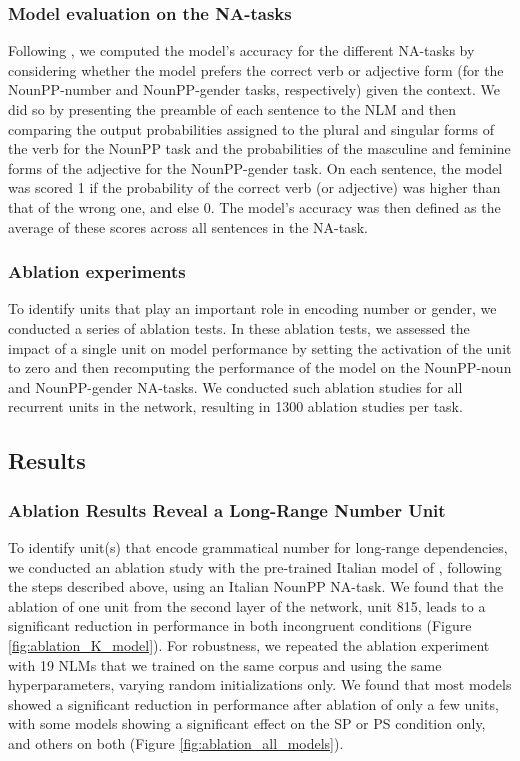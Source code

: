 \subsubsection{Model evaluation on the NA-tasks}\label{sss:model_eval}
Following \citet{Linzen:etal:2016}, we computed the model's accuracy for the different NA-tasks by considering whether the model prefers the correct verb or adjective form (for the NounPP-number and NounPP-gender tasks, respectively) given the context. We did so by presenting the preamble of each sentence to the NLM and then comparing the output probabilities assigned to the plural and singular forms of the verb for the NounPP task and the probabilities of the masculine and feminine forms of the adjective for the NounPP-gender task. On each sentence, the model was scored 1 if the probability of the correct verb (or adjective) was higher than that of the wrong one, and else 0. 
The model's accuracy was then defined as the average of these scores across all sentences in the NA-task. 

\subsubsection{Ablation experiments}
To identify units that play an important role in encoding number or gender, we conducted a series of ablation tests.
In these ablation tests, we assessed the impact of a single unit on model performance by setting the activation of the unit to zero and then recomputing the performance of the model on the NounPP-noun and NounPP-gender NA-tasks. 
We conducted such ablation studies for all recurrent units in the network, resulting in 1300 ablation studies per task.

\subsection{Results}
\subsubsection{Ablation Results Reveal a Long-Range Number Unit} To identify unit(s) that encode grammatical number for long-range dependencies, we conducted an ablation study with the pre-trained Italian model of \citet{Gulordava:etal:2018}, following the steps described above, using an Italian NounPP NA-task. 
We found that the ablation of one unit from the second layer of the network, unit 815, leads to a significant reduction in performance in both incongruent conditions (Figure \ref{fig:ablation_K_model}). For robustness, we repeated the ablation experiment with 19 NLMs that we trained on the same corpus and using the same hyperparameters, varying random initializations only. We found that most models showed a significant reduction in performance after ablation of only a few units, with some models showing a significant effect on the SP or PS condition only, and others on both (Figure \ref{fig:ablation_all_models}).

